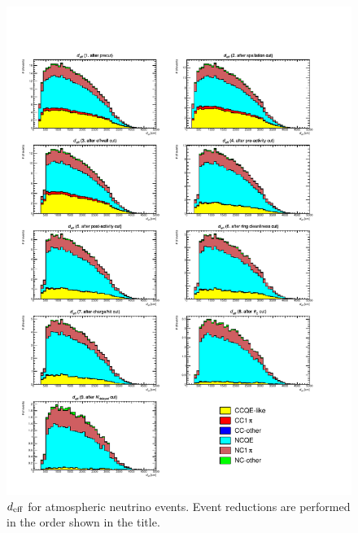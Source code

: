 \begin{figure}[h]
	\centering
	\includegraphics[width=15cm]{PDF/Dist_ATM/Che_50deg_tag_ge1/All/effwall}
	\caption[$d_{\rm eff}$ for atmospheric neutrino events]{
	$d_{\rm eff}$ for atmospheric neutrino events.
	Event reductions are performed in the order shown in the title.
	}\label{ATM_effwall}
\end{figure}


